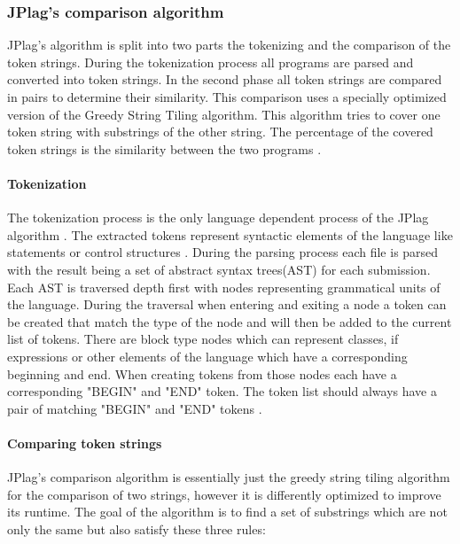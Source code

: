 \documentclass[a4paper, 11pt]{article}
\renewcommand{\\}{\vspace*{0.5\baselineskip} \newline}
\begin{document}
\subsubsection{JPlag's comparison algorithm}

JPlag's algorithm is split into two parts the tokenizing and the comparison of the token strings. During the tokenization
process all programs are parsed and converted into token strings. In the second phase all token strings are compared
in pairs to determine their similarity. This comparison uses a specially optimized version of the Greedy String Tiling
algorithm. This algorithm tries to cover one token string with substrings of the other string. The percentage of the covered token 
strings is the similarity between the two programs \autocite[p. 10]{JPlagP}.

\paragraph{Tokenization}

The tokenization process is the only language dependent process of the JPlag algorithm \autocite[p. 10]{JPlagP}. The extracted tokens
represent syntactic elements of the language like statements or control structures \autocite[How are submissions represented? — Notion of Token]{JPlagW4}.
During the parsing process each file is parsed with the result being a set of abstract syntax trees(AST) for each submission. Each AST
is traversed depth first with nodes representing grammatical units of the language. During the traversal when entering and exiting a 
node a token can be created that match the type of the node and will then be added to the current list of tokens. There are block type
nodes which can represent classes, if expressions or other elements of the language which have a corresponding beginning and end. When
creating tokens from those nodes each have a corresponding "BEGIN" and "END" token. The token list should always have a pair of matching
"BEGIN" and "END" tokens \autocite[How does the transformation work?]{JPlagW4}.

\paragraph{Comparing token strings}

JPlag's comparison algorithm is essentially just the greedy string tiling algorithm for the comparison of two strings, however it is differently
optimized to improve its runtime\autocite[p. 5]{JPlagP}. The goal of the algorithm is to find a set of substrings
which are not only the same but also satisfy these three rules:
\end{document}
